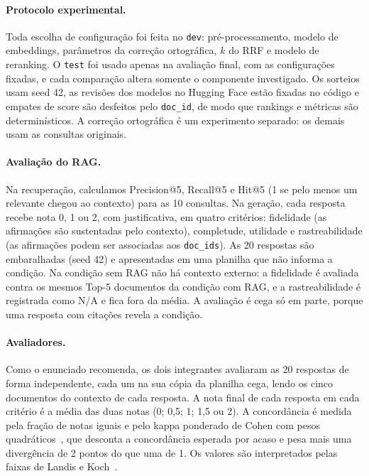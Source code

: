 \documentclass[11pt,a4paper]{article}
\newcommand{\cod}[1]{\texttt{#1}}
\begin{document}
\paragraph{Protocolo experimental.} Toda escolha de configuração foi feita no \cod{dev}: pré-processamento, modelo de embeddings, parâmetros da correção ortográfica, $k$ do RRF e modelo de reranking. O \cod{test} foi usado apenas na avaliação final, com as configurações fixadas, e cada comparação altera somente o componente investigado. Os sorteios usam seed 42, as revisões dos modelos no Hugging Face estão fixadas no código e empates de score são desfeitos pelo \cod{doc\_id}, de modo que rankings e métricas são determinísticos. A correção ortográfica é um experimento separado: os demais usam as consultas originais.

\paragraph{Avaliação do RAG.} Na recuperação, calculamos Precision@5, Recall@5 e Hit@5 (1 se pelo menos um relevante chegou ao contexto) para as 10 consultas. Na geração, cada resposta recebe nota 0, 1 ou 2, com justificativa, em quatro critérios: fidelidade (as afirmações são sustentadas pelo contexto), completude, utilidade e rastreabilidade (as afirmações podem ser associadas aos \cod{doc\_ids}). As 20 respostas são embaralhadas (seed 42) e apresentadas em uma planilha que não informa a condição. Na condição sem RAG não há contexto externo: a fidelidade é avaliada contra os mesmos Top-5 documentos da condição com RAG, e a rastreabilidade é registrada como N/A e fica fora da média. A avaliação é cega só em parte, porque uma resposta com citações revela a condição.

\paragraph{Avaliadores.} Como o enunciado recomenda, os dois integrantes avaliaram as 20 respostas de forma independente, cada um na sua cópia da planilha cega, lendo os cinco documentos do contexto de cada resposta. A nota final de cada resposta em cada critério é a média das duas notas (0; 0,5; 1; 1,5 ou 2). A concordância é medida pela fração de notas iguais e pelo kappa ponderado de Cohen com pesos quadráticos~\cite{cohen1968}, que desconta a concordância esperada por acaso e pesa mais uma divergência de 2 pontos do que uma de 1. Os valores são interpretados pelas faixas de Landis e Koch~\cite{landis1977}.
\end{document}
